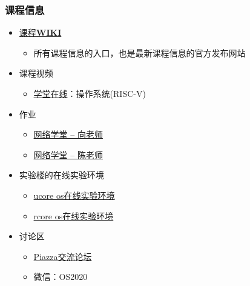 \begin{frame}
	\frametitle{课程信息}
	\begin{itemize}
		\item \href{http://os.cs.tsinghua.edu.cn/oscourse/OS2020spring}{课程\textbf{WIKI}}
		\begin{itemize}
		\item 所有课程信息的入口，也是最新课程信息的官方发布网站
	    \end{itemize}
		\pause
		\item 课程视频
		\begin{itemize}
    		\item \href{https://next.xuetangx.com/}{学堂在线}：操作系统(RISC-V)
    	\end{itemize}
		\pause
    	\item 作业
    	\begin{itemize}
    	    \item \href{http://learn.tsinghua.edu.cn/f/wlxt/index/course/teacher/course?wlkcid=2019-2020-2140259621}{网络学堂 -- 向老师}		
		    \item \href{http://learn.tsinghua.edu.cn/f/wlxt/index/course/teacher/course?wlkcid=2019-2020-2140259622}{网络学堂 -- 陈老师}
    	\end{itemize}
		\pause
    	\item 实验楼的在线实验环境
    	\begin{itemize}
		    \item \href{https://www.shiyanlou.com/courses/221}{ucore os在线实验环境}
		    \item \href{https://www.shiyanlou.com/courses/1481}{rcore os在线实验环境}
		\end{itemize}
		\item 讨论区
		\begin{itemize}
		    \item \href{https://piazza.com/tsinghua.edu.cn/spring2015/30240243x/home}{Piazza交流论坛}
		    \item 微信：OS2020
		\end{itemize}
	\end{itemize}
\end{frame}



